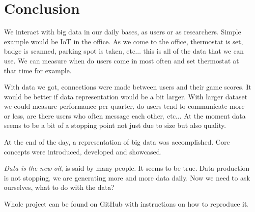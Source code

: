 \section{Conclusion}\label{Conclusion}

We interact with big data in our daily bases, as users or as researchers. Simple example would be IoT in the office. As we come to the office, thermostat is set, badge is scanned, parking spot is taken, etc... this is all of the data that we can use. We can measure when do users come in most often and set thermostat at that time for example.

With data we got, connections were made between users and their game scores. It would be better if data representation would be a bit larger. With larger dataset we could measure performance per quarter, do users tend to communicate more or less, are there users who often message each other, etc... At the moment data seems to be a bit of a stopping point not just due to size but also quality. 

At the end of the day, a representation of big data was accomplished. Core concepts were introduced, developed and showcased. 

\textit{Data is the new oil}, is said by many people. It seems to be true. Data production is not stopping, we are generating more and more data daily. Now we need to ask ourselves, what to do with the data?

Whole project can be found on GitHub \parencite{web:GitHub} with instructions on how to reproduce it.